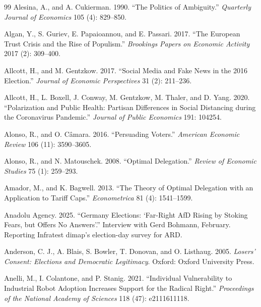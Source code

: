 \documentclass[12pt,letterpaper]{article}
\begin{document}
\begin{thebibliography}{99}
Alesina, A., and A. Cukierman. 1990. ``The Politics of Ambiguity.'' \textit{Quarterly Journal of Economics} 105 (4): 829--850.

Algan, Y., S. Guriev, E. Papaioannou, and E. Passari. 2017. ``The European Trust Crisis and the Rise of Populism.'' \textit{Brookings Papers on Economic Activity} 2017 (2): 309--400.

Allcott, H., and M. Gentzkow. 2017. ``Social Media and Fake News in the 2016 Election.'' \textit{Journal of Economic Perspectives} 31 (2): 211--236.

Allcott, H., L. Boxell, J. Conway, M. Gentzkow, M. Thaler, and D. Yang. 2020. ``Polarization and Public Health: Partisan Differences in Social Distancing during the Coronavirus Pandemic.'' \textit{Journal of Public Economics} 191: 104254.

Alonso, R., and O. C\^{a}mara. 2016. ``Persuading Voters.'' \textit{American Economic Review} 106 (11): 3590--3605.

Alonso, R., and N. Matouschek. 2008. ``Optimal Delegation.'' \textit{Review of Economic Studies} 75 (1): 259--293.

Amador, M., and K. Bagwell. 2013. ``The Theory of Optimal Delegation with an Application to Tariff Caps.'' \textit{Econometrica} 81 (4): 1541--1599.

Anadolu Agency. 2025. ``Germany Elections: `Far-Right AfD Rising by Stoking Fears, but Offers No Answers'.'' Interview with Gerd Bohmann, February. Reporting Infratest dimap's election-day survey for ARD.

Anderson, C. J., A. Blais, S. Bowler, T. Donovan, and O. Listhaug. 2005. \textit{Losers' Consent: Elections and Democratic Legitimacy}. Oxford: Oxford University Press.

Anelli, M., I. Colantone, and P. Stanig. 2021. ``Individual Vulnerability to Industrial Robot Adoption Increases Support for the Radical Right.'' \textit{Proceedings of the National Academy of Sciences} 118 (47): e2111611118.


\end{thebibliography}
\end{document}
